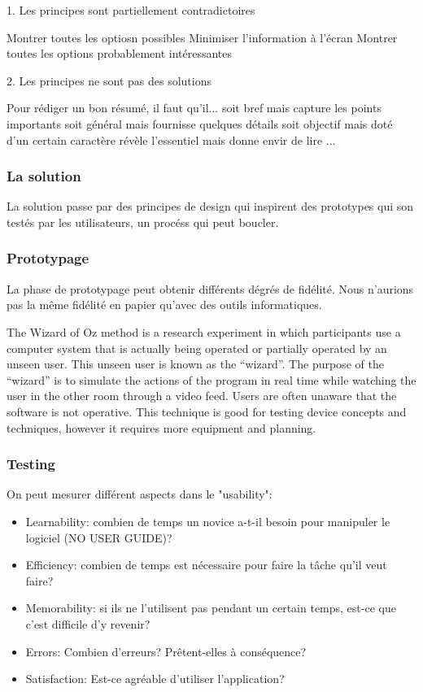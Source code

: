 1. Les principes sont partiellement contradictoires

Montrer toutes les
optiosn possibles
Minimiser
l’information à
l’écran
Montrer toutes les options
probablement intéressantes

2. Les principes ne sont pas des solutions

Pour rédiger un bon résumé, il faut qu’il...
soit bref mais capture les points importants
soit général mais fournisse quelques détails
soit objectif mais doté d’un certain caractère
révèle l’essentiel mais donne envir de lire
...

\subsubsection{La solution}

La solution passe par des principes de design qui inspirent des prototypes qui son test\'es par les utilisateurs, un proc\'ess qui peut boucler.

\subsubsection{Prototypage}

La phase de prototypage peut obtenir diff\'erents d\'egr\'es de fid\'elit\'e. Nous n'aurions pas la m\^eme fid\'elit\'e en papier qu'avec des outils informatiques. 

The Wizard of Oz method is a research experiment in which participants use a computer system that is actually being operated or partially operated by an unseen user. This unseen user is known as the “wizard”. The purpose of the “wizard” is to simulate the actions of the program in real time while watching the user in the other room through a video feed. Users are often unaware that the software is not operative. This technique is good for testing device concepts and techniques, however it requires more equipment and planning.

\subsubsection{Testing}

On peut mesurer diff\'erent aspects dans le "usability":

\begin{itemize}
\item Learnability: combien de temps un novice a-t-il besoin pour manipuler le logiciel (NO USER GUIDE)?
\item Efficiency: combien de temps est n\'ecessaire pour faire la t\^ache qu'il veut faire?
\item Memorability: si ils ne l'utilisent pas pendant un certain temps, est-ce que c'est difficile d'y revenir?
\item Errors: Combien d'erreurs? Pr\^etent-elles \`a cons\'equence?
\item Satisfaction: Est-ce agr\'eable d'utiliser l'application?
\end{itemize}


